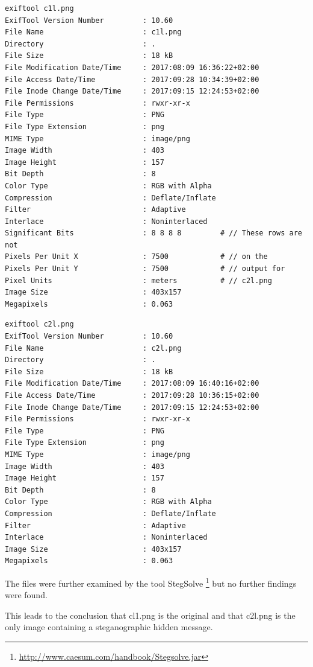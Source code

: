 \documentclass[a4paper,10pt,oneside]{article}
\begin{document}
\begin{lstlisting}[caption=ExifTool output for 'c1l.png']
exiftool c1l.png
ExifTool Version Number         : 10.60
File Name                       : c1l.png
Directory                       : .
File Size                       : 18 kB
File Modification Date/Time     : 2017:08:09 16:36:22+02:00
File Access Date/Time           : 2017:09:28 10:34:39+02:00
File Inode Change Date/Time     : 2017:09:15 12:24:53+02:00
File Permissions                : rwxr-xr-x
File Type                       : PNG
File Type Extension             : png
MIME Type                       : image/png
Image Width                     : 403
Image Height                    : 157
Bit Depth                       : 8
Color Type                      : RGB with Alpha
Compression                     : Deflate/Inflate
Filter                          : Adaptive
Interlace                       : Noninterlaced
Significant Bits                : 8 8 8 8         # // These rows are not
Pixels Per Unit X               : 7500            # // on the
Pixels Per Unit Y               : 7500            # // output for
Pixel Units                     : meters          # // c2l.png
Image Size                      : 403x157
Megapixels                      : 0.063
\end{lstlisting}

\begin{lstlisting}[caption=ExifTool output for 'c2l.png']
exiftool c2l.png
ExifTool Version Number         : 10.60
File Name                       : c2l.png
Directory                       : .
File Size                       : 18 kB
File Modification Date/Time     : 2017:08:09 16:40:16+02:00
File Access Date/Time           : 2017:09:28 10:36:15+02:00
File Inode Change Date/Time     : 2017:09:15 12:24:53+02:00
File Permissions                : rwxr-xr-x
File Type                       : PNG
File Type Extension             : png
MIME Type                       : image/png
Image Width                     : 403
Image Height                    : 157
Bit Depth                       : 8
Color Type                      : RGB with Alpha
Compression                     : Deflate/Inflate
Filter                          : Adaptive
Interlace                       : Noninterlaced
Image Size                      : 403x157
Megapixels                      : 0.063
\end{lstlisting}
The files were further examined by the tool StegSolve \footnote{\url{http://www.caesum.com/handbook/Stegsolve.jar}} but no further findings were found.


This leads to the conclusion that cl1.png is the original and that c2l.png is the only image containing a steganographic hidden message.



%
%
\end{document}
